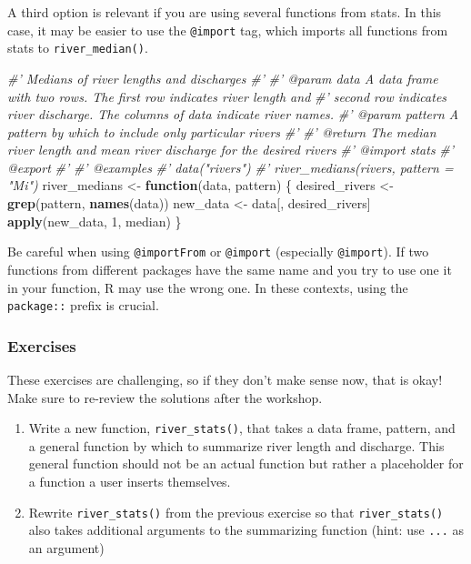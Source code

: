 \documentclass[
]{book}
\newenvironment{Shaded}{\begin{snugshade}}{\end{snugshade}}
\newcommand{\CommentTok}[1]{\textcolor[rgb]{0.56,0.35,0.01}{\textit{#1}}}
\newcommand{\ControlFlowTok}[1]{\textcolor[rgb]{0.13,0.29,0.53}{\textbf{#1}}}
\newcommand{\DecValTok}[1]{\textcolor[rgb]{0.00,0.00,0.81}{#1}}
\newcommand{\KeywordTok}[1]{\textcolor[rgb]{0.13,0.29,0.53}{\textbf{#1}}}
\newcommand{\NormalTok}[1]{#1}
\newcommand{\StringTok}[1]{\textcolor[rgb]{0.31,0.60,0.02}{#1}}
\begin{document}
A third option is relevant if you are using several functions from stats. In this case, it may be easier to use the \texttt{@import} tag, which imports all functions from stats to \texttt{river\_median()}.

\begin{Shaded}
\begin{Highlighting}[]
\CommentTok{#' Medians of river lengths and discharges}
\CommentTok{#'}
\CommentTok{#' @param data A data frame with two rows. The first row indicates river length and}
\CommentTok{#'   second row indicates river discharge. The columns of data indicate river names.}
\CommentTok{#' @param pattern A pattern by which to include only particular rivers}
\CommentTok{#'}
\CommentTok{#' @return The median river length and mean river discharge for the desired rivers}
\CommentTok{#' @import stats}
\CommentTok{#' @export}
\CommentTok{#'}
\CommentTok{#' @examples}
\CommentTok{#' data("rivers")}
\CommentTok{#' river_medians(rivers, pattern = "Mi")}
\NormalTok{river_medians <-}\StringTok{ }\ControlFlowTok{function}\NormalTok{(data, pattern) \{}
\NormalTok{  desired_rivers <-}\StringTok{ }\KeywordTok{grep}\NormalTok{(pattern, }\KeywordTok{names}\NormalTok{(data))}
\NormalTok{  new_data <-}\StringTok{ }\NormalTok{data[, desired_rivers]}
  \KeywordTok{apply}\NormalTok{(new_data, }\DecValTok{1}\NormalTok{, median)}
\NormalTok{\}}
\end{Highlighting}
\end{Shaded}

Be careful when using \texttt{@importFrom} or \texttt{@import} (especially \texttt{@import}). If two functions from different packages have the same name and you try to use one it in your function, R may use the wrong one. In these contexts, using the \texttt{package::} prefix is crucial.

\hypertarget{ex-set3}{%
\subsubsection{Exercises}\label{ex-set3}}

These exercises are challenging, so if they don't make sense now, that is okay! Make sure to re-review the solutions after the workshop.

\begin{enumerate}
\def\labelenumi{\arabic{enumi}.}
\item
  Write a new function, \texttt{river\_stats()}, that takes a data frame, pattern, and a general function by which to summarize river length and discharge. This general function should not be an actual function but rather a placeholder for a function a user inserts themselves.
\item
  Rewrite \texttt{river\_stats()} from the previous exercise so that \texttt{river\_stats()} also takes additional arguments to the summarizing function (hint: use \texttt{...} as an argument)
\end{enumerate}
\end{document}
